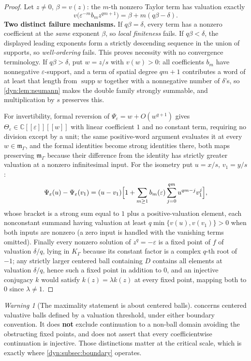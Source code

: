 \documentclass[11pt,letterpaper]{article}
\theoremstyle{definition}
\theoremstyle{remark}
\newtheorem{warning}[warning]{Warning}
\newcommand{\C}{\mathbb C}
\newcommand{\m}{\mathfrak m}
\newcommand{\supp}{\operatorname{supp}}
\newcommand{\eps}{\varepsilon}
\numberwithin{equation}{section}
\begin{document}
\begin{proof}
Let $z\ne0$, $\beta=v(z)$: the $m$-th nonzero Taylor term has valuation
exactly
\begin{equation}\label{dyn:eq:termvaluation}
 v\bigl(\eps^{-m}b_mz^{qm+1}\bigr)=\beta+m(q\beta-\delta).
\end{equation}
\textbf{Two distinct failure mechanisms.} If $q\beta=\delta$, every term
has a nonzero coefficient at the \emph{same} exponent $\beta$, so
\emph{local finiteness} fails. If $q\beta<\delta$, the displayed leading
exponents form a strictly descending sequence in the union of supports, so
\emph{well-ordering} fails. This proves necessity with no convergence
terminology. If $q\beta>\delta$, put $w=z/s$ with $v(w)>0$: all
coefficients $b_m$ have nonnegative $\eps$-support, and a term of spatial
degree $qm+1$ contributes a word of at least that length from $\supp w$
together with a nonnegative number of $\delta$'s, so
\cref{dyn:lem:neumann} makes the double family strongly summable, and
multiplication by $s$ preserves this.

For invertibility, formal reversion of $\Psi_\eps=w+O(w^{q+1})$ gives
$\Theta_\eps\in\C[[\eps]][[w]]$ with linear coefficient $1$ and no constant
term, requiring no division except by a unit; the same positive-word
argument evaluates it at every $w\in\m_\Gamma$, and the formal identities
become strong identities there, both maps preserving $\m_\Gamma$ because
their difference from the identity has strictly greater valuation at a
nonzero infinitesimal input. For the isometry put $u=x/s$, $v_1=y/s$:
\[
 \Psi_\eps(u)-\Psi_\eps(v_1)=(u-v_1)
 \Bigl[1+\sum_{m\ge1}b_m(\eps)\sum_{j=0}^{qm}u^{qm-j}v_1^{j}\Bigr],
\]
whose bracket is a strong sum equal to $1$ plus a positive-valuation
element, each nonconstant summand having valuation at least
$q\min\{v(u),v(v_1)\}>0$ when both inputs are nonzero (a zero input is
handled with the vanishing terms omitted). Finally every nonzero solution
of $z^{q}=-\eps$ is a fixed point of $f$ of valuation $\delta/q$, lying in
$K_\Gamma$ because its constant factor is a complex $q$-th root of $-1$;
any strictly larger centered ball containing $D$ contains all elements at
valuation $\delta/q$, hence such a fixed point in addition to $0$, and an
injective conjugacy $k$ would satisfy $k(z)=\lambda k(z)$ at every fixed
point, mapping both to $0$ since $\lambda\ne1$.
\end{proof}

\begin{warning}[The maximality statement is about centered balls]
\label{dyn:warn:sharp}
 concerns centered valuative balls defined by a
valuation threshold, under either boundary convention. It does \textbf{not}
exclude continuation to a non-ball domain avoiding the obstructing fixed
points, and does not assert that every coefficientwise continuation is
injective. Those distinctions matter at the critical scale, which is
exactly where \cref{dyn:subsec:boundary} operates.
\end{warning}
\end{document}
